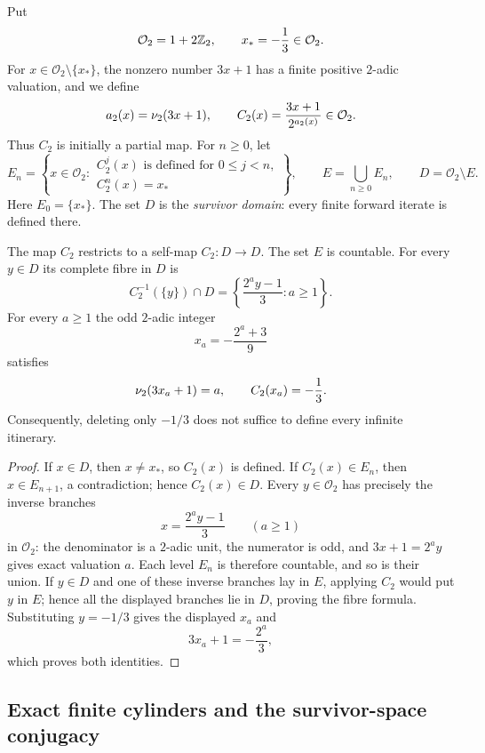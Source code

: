Put
\[
 \mathcal O_2=1+2\mathbb{Z}_{2},
 \qquad x_*=-\frac13\in\mathcal O_2.
\]
For $x\in\mathcal O_2\setminus\{x_*\}$, the nonzero number $3x+1$ has a
finite positive $2$-adic valuation, and we define
\begin{equation}
\label{eq:symbolic-C2-partial}
 a_2(x)=\nu_{2}(3x+1),
 \qquad
 C_2(x)=\frac{3x+1}{2^{a_2(x)}}\in\mathcal O_2.
\end{equation}
Thus $C_2$ is initially a partial map.  For $n\geq0$, let
\[
 E_n=\left\{x\in\mathcal O_2:
 \begin{array}{l}
 C_2^j(x)\text{ is defined for }0\leq j<n,\\[-1mm]
 C_2^n(x)=x_*
 \end{array}\right\},
 \qquad E=\bigcup_{n\geq0}E_n,
 \qquad D=\mathcal O_2\setminus E.
\]
Here $E_0=\{x_*\}$.  The set $D$ is the \emph{survivor domain}: every
finite forward iterate is defined there.

\begin{lemma}
\label{lem:symbolic-exceptional-backward-orbit}
The map $C_2$ restricts to a self-map $C_2:D\to D$.  The set $E$ is
countable.  For every $y\in D$ its complete fibre in $D$ is
\[
 C_2^{-1}(\{y\})\cap D
 =\left\{\frac{2^ay-1}{3}:a\geq1\right\}.
\]
For every $a\geq1$ the odd $2$-adic integer
\[
 x_a=-\frac{2^a+3}{9}
\]
satisfies
\[
 \nu_{2}(3x_a+1)=a,
 \qquad C_2(x_a)=-\frac13.
\]
Consequently, deleting only $-1/3$ does not suffice to define every
infinite itinerary.
\end{lemma}

\begin{proof}
If $x\in D$, then $x\ne x_*$, so $C_2(x)$ is defined.  If
$C_2(x)\in E_n$, then $x\in E_{n+1}$, a contradiction; hence $C_2(x)\in D$.
Every $y\in\mathcal O_2$ has precisely the inverse branches
\[
 x=\frac{2^a y-1}{3}\qquad(a\geq1)
\]
in $\mathcal O_2$: the denominator is a $2$-adic unit, the numerator is
odd, and $3x+1=2^ay$ gives exact valuation $a$.  Each level $E_n$ is
therefore countable, and so is their union.  If $y\in D$ and one of these
inverse branches lay in $E$, applying $C_2$ would put $y$ in $E$; hence all
the displayed branches lie in $D$, proving the fibre formula.  Substituting
$y=-1/3$ gives
the displayed $x_a$ and
\[
 3x_a+1=-\frac{2^a}{3},
\]
which proves both identities.
\end{proof}

\subsection{Exact finite cylinders and the survivor-space conjugacy}


